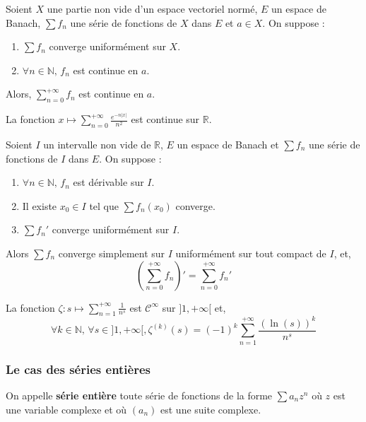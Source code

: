 	\begin{theorem}
		Soient $X$ une partie non vide d'un espace vectoriel normé, $E$ un espace de Banach, $\sum f_n$ une série de fonctions de $X$ dans $E$ et $a \in X$. On suppose :
		\begin{enumerate}[label=(\roman*)]
			\item $\sum f_n$ converge uniformément sur $X$.
			\item $\forall n \in \mathbb{N}, \, f_n$ est continue en $a$.
		\end{enumerate}
		Alors, $\sum_{n=0}^{+\infty} f_n$ est continue en $a$.
	\end{theorem}

	\begin{example}
		La fonction $x \mapsto \sum_{n=0}^{+\infty} \frac{e^{-n\vert x \vert}}{n^2}$ est continue sur $\mathbb{R}$.
	\end{example}

	\begin{theorem}
		Soient $I$ un intervalle non vide de $\mathbb{R}$, $E$ un espace de Banach et $\sum f_n$ une série de fonctions de $I$ dans $E$. On suppose :
		\begin{enumerate}[label=(\roman*)]
			\item $\forall n \in \mathbb{N}, \, f_n$ est dérivable sur $I$.
			\item Il existe $x_0 \in I$ tel que $\sum f_n(x_0)$ converge.
			\item $\sum f_n'$ converge uniformément sur $I$.
		\end{enumerate}
		Alors $\sum f_n$ converge simplement sur $I$ uniformément sur tout compact de $I$, et,
		\[ \left( \sum_{n=0}^{+\infty} f_n \right)' = \sum_{n=0}^{+\infty} f_n' \]
	\end{theorem}

	\begin{example}
		La fonction $\zeta : s \mapsto \sum_{n=1}^{+\infty} \frac{1}{n^s}$ est $\mathcal{C}^\infty$ sur $]1, +\infty[$ et,
		\[ \forall k \in \mathbb{N}, \, \forall s \in ]1, +\infty[, \zeta^{(k)}(s) = (-1)^k \sum_{n=1}^{+\infty} \frac{(\ln(s))^k}{n^s} \]
	\end{example}

	\subsubsection{Le cas des séries entières}


	\begin{definition}
		On appelle \textbf{série entière} toute série de fonctions de la forme $\sum a_n z^n$ où $z$ est une variable complexe et où $(a_n)$ est une suite complexe.
	\end{definition}

